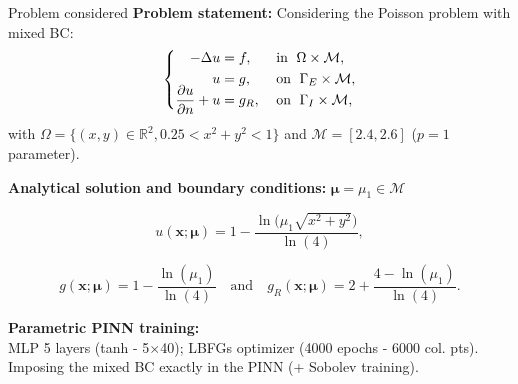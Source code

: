 \begin{frame}{Problem considered} 
	\textbf{Problem statement:} Considering the Poisson problem with mixed BC:
	\vspace{-5pt}
	\begin{equation*}
		\left\{
		\begin{aligned}
			-\Delta u & = f, \; &  & \text{in } \; \Omega \times \mathcal{M}, \\
			u         & = g, \;  &  & \text{on } \; \Gamma_E \times \mathcal{M}, \\
			\smash{\frac{\partial u}{\partial n}}+u  & = g_R, \;  &  & \text{on } \; \Gamma_I \times \mathcal{M},
		\end{aligned}
		\right.
	\end{equation*}

	with $\Omega=\{(x,y)\in\mathbb{R}^2, 0.25 < x^2+y^2 < 1\}$ and $\mathcal{M}=[2.4,2.6]$ ($p=1$ parameter).
		
	\vspace{8pt}
	\textbf{Analytical solution and boundary conditions:} $\bm{\mu}=\mu_1 \in \mathcal{M}$

	\vspace{-8pt}
	\begin{equation*}
		u(\bm{x};\bm{\mu})= 1 - \frac{\ln\big(\mu_1\sqrt{x^2+y^2}\big)}{\ln(4)},
	\end{equation*}

    \vspace{-5pt}
	\begin{equation*}
		g(\bm{x};\bm{\mu})=1 - \frac{\ln(\mu_1)}{\ln(4)} \quad \text{and} \quad g_R(\bm{x};\bm{\mu})=2 + \frac{4-\ln(\mu_1)}{\ln(4)}.
	\end{equation*}

	\vspace{2pt}
	\textbf{Parametric PINN training:} \\
    MLP 5 layers (tanh - 5$\times$40); LBFGs optimizer (4000 epochs - 6000 col. pts). \\
	Imposing the mixed BC exactly in the PINN (+ Sobolev training).

	\vspace{8pt}
\end{frame}

